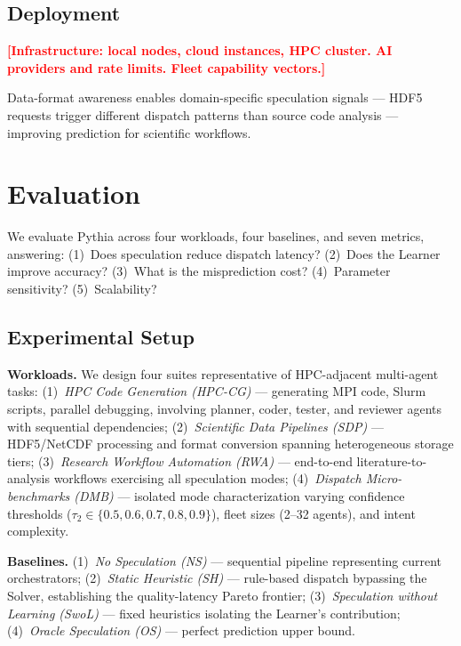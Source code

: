 \documentclass[conference,10pt]{IEEEtran}
\newcommand{\placeholder}[1]{\textcolor{red}{\textbf{[#1]}}}
\begin{document}
\subsection{Deployment}

\placeholder{Infrastructure: local nodes, cloud instances, HPC cluster. AI providers and rate limits. Fleet capability vectors.}

Data-format awareness enables domain-specific speculation signals --- HDF5 requests trigger different dispatch patterns than source code analysis --- improving prediction for scientific workflows.



\section{Evaluation}
\label{sec:evaluation}

We evaluate Pythia across four workloads, four baselines, and seven metrics, answering: (1)~Does speculation reduce dispatch latency? (2)~Does the Learner improve accuracy? (3)~What is the misprediction cost? (4)~Parameter sensitivity? (5)~Scalability?

\subsection{Experimental Setup}

\textbf{Workloads.} We design four suites representative of HPC-adjacent multi-agent tasks:
(1)~\emph{HPC Code Generation (HPC-CG)} --- generating MPI code, Slurm scripts, parallel debugging, involving planner, coder, tester, and reviewer agents with sequential dependencies;
(2)~\emph{Scientific Data Pipelines (SDP)} --- HDF5/NetCDF processing and format conversion spanning heterogeneous storage tiers;
(3)~\emph{Research Workflow Automation (RWA)} --- end-to-end literature-to-analysis workflows exercising all speculation modes;
(4)~\emph{Dispatch Micro-benchmarks (DMB)} --- isolated mode characterization varying confidence thresholds ($\tau_2 \in \{0.5, 0.6, 0.7, 0.8, 0.9\}$), fleet sizes (2--32 agents), and intent complexity.

\textbf{Baselines.}
(1)~\emph{No Speculation (NS)} --- sequential pipeline representing current orchestrators;
(2)~\emph{Static Heuristic (SH)} --- rule-based dispatch bypassing the Solver, establishing the quality-latency Pareto frontier;
(3)~\emph{Speculation without Learning (SwoL)} --- fixed heuristics isolating the Learner's contribution;
(4)~\emph{Oracle Speculation (OS)} --- perfect prediction upper bound.
\end{document}
